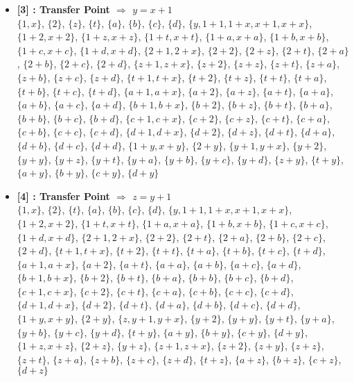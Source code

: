 \begin{itemize}
    \item \textbf{[3] : Transfer Point $\Rightarrow$ $y = x + 1$}\\
        $\{1, x\}$, $\{2\}$, $\{z\}$, $\{t\}$, $\{a\}$, $\{b\}$, $\{c\}$, $\{d\}$, $\{y, 1 + 1, 1 + x, x + 1, x + x\}$, $\{1 + 2, x + 2\}$, $\{1 + z, x + z\}$, $\{1 + t, x + t\}$, $\{1 + a, x + a\}$, $\{1 + b, x + b\}$, $\{1 + c, x + c\}$, $\{1 + d, x + d\}$, $\{2 + 1, 2 + x\}$, $\{2 + 2\}$, $\{2 + z\}$, $\{2 + t\}$, $\{2 + a\}$, $\{2 + b\}$, $\{2 + c\}$, $\{2 + d\}$, $\{z + 1, z + x\}$, $\{z + 2\}$, $\{z + z\}$, $\{z + t\}$, $\{z + a\}$, $\{z + b\}$, $\{z + c\}$, $\{z + d\}$, $\{t + 1, t + x\}$, $\{t + 2\}$, $\{t + z\}$, $\{t + t\}$, $\{t + a\}$, $\{t + b\}$, $\{t + c\}$, $\{t + d\}$, $\{a + 1, a + x\}$, $\{a + 2\}$, $\{a + z\}$, $\{a + t\}$, $\{a + a\}$, $\{a + b\}$, $\{a + c\}$, $\{a + d\}$, $\{b + 1, b + x\}$, $\{b + 2\}$, $\{b + z\}$, $\{b + t\}$, $\{b + a\}$, $\{b + b\}$, $\{b + c\}$, $\{b + d\}$, $\{c + 1, c + x\}$, $\{c + 2\}$, $\{c + z\}$, $\{c + t\}$, $\{c + a\}$, $\{c + b\}$, $\{c + c\}$, $\{c + d\}$, $\{d + 1, d + x\}$, $\{d + 2\}$, $\{d + z\}$, $\{d + t\}$, $\{d + a\}$, $\{d + b\}$, $\{d + c\}$, $\{d + d\}$, $\{1 + y, x + y\}$, $\{2 + y\}$, $\{y + 1, y + x\}$, $\{y + 2\}$, $\{y + y\}$, $\{y + z\}$, $\{y + t\}$, $\{y + a\}$, $\{y + b\}$, $\{y + c\}$, $\{y + d\}$, $\{z + y\}$, $\{t + y\}$, $\{a + y\}$, $\{b + y\}$, $\{c + y\}$, $\{d + y\}$

    \item \textbf{[4] : Transfer Point $\Rightarrow$ $z = y + 1$}\\
        $\{1, x\}$, $\{2\}$, $\{t\}$, $\{a\}$, $\{b\}$, $\{c\}$, $\{d\}$, $\{y, 1 + 1, 1 + x, x + 1, x + x\}$, $\{1 + 2, x + 2\}$, $\{1 + t, x + t\}$, $\{1 + a, x + a\}$, $\{1 + b, x + b\}$, $\{1 + c, x + c\}$, $\{1 + d, x + d\}$, $\{2 + 1, 2 + x\}$, $\{2 + 2\}$, $\{2 + t\}$, $\{2 + a\}$, $\{2 + b\}$, $\{2 + c\}$, $\{2 + d\}$, $\{t + 1, t + x\}$, $\{t + 2\}$, $\{t + t\}$, $\{t + a\}$, $\{t + b\}$, $\{t + c\}$, $\{t + d\}$, $\{a + 1, a + x\}$, $\{a + 2\}$, $\{a + t\}$, $\{a + a\}$, $\{a + b\}$, $\{a + c\}$, $\{a + d\}$, $\{b + 1, b + x\}$, $\{b + 2\}$, $\{b + t\}$, $\{b + a\}$, $\{b + b\}$, $\{b + c\}$, $\{b + d\}$, $\{c + 1, c + x\}$, $\{c + 2\}$, $\{c + t\}$, $\{c + a\}$, $\{c + b\}$, $\{c + c\}$, $\{c + d\}$, $\{d + 1, d + x\}$, $\{d + 2\}$, $\{d + t\}$, $\{d + a\}$, $\{d + b\}$, $\{d + c\}$, $\{d + d\}$, $\{1 + y, x + y\}$, $\{2 + y\}$, $\{z, y + 1, y + x\}$, $\{y + 2\}$, $\{y + y\}$, $\{y + t\}$, $\{y + a\}$, $\{y + b\}$, $\{y + c\}$, $\{y + d\}$, $\{t + y\}$, $\{a + y\}$, $\{b + y\}$, $\{c + y\}$, $\{d + y\}$, $\{1 + z, x + z\}$, $\{2 + z\}$, $\{y + z\}$, $\{z + 1, z + x\}$, $\{z + 2\}$, $\{z + y\}$, $\{z + z\}$, $\{z + t\}$, $\{z + a\}$, $\{z + b\}$, $\{z + c\}$, $\{z + d\}$, $\{t + z\}$, $\{a + z\}$, $\{b + z\}$, $\{c + z\}$, $\{d + z\}$


\end{itemize}
